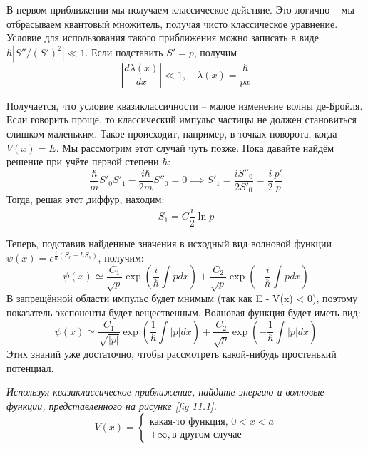 В первом приближении мы получаем классическое действие. Это логично -- мы отбрасываем квантовый множитель, получая чисто классическое уравнение. Условие для использования такого приближения можно записать в виде $\hbar|S''/(S')^2| \ll 1$. Если подставить $S' = p$, получим
\[
|\frac{d\lambda(x)}{dx}| \ll 1, \quad \lambda(x) = \frac{\hbar}{px}
\]

Получается, что условие квазиклассичности -- малое изменение волны де-Бройля. Если говорить проще, то классический импульс частицы не должен становиться слишком маленьким. Такое происходит, например, в точках поворота, когда $V(x) = E$. Мы рассмотрим этот случай чуть позже. Пока давайте найдём решение при учёте первой степени $\hbar$:
\[
\frac{\hbar}{m}S'_0 S'_1 - \frac{i\hbar}{2m}S''_0 = 0 \implies S'_1 = \frac{iS''_0}{2S'_0} = \frac{i}{2}\frac{p'}{p}
\]
Тогда, решая этот диффур, находим:
\[
S_1 = C\frac{i}{2}\ln p
\]

Теперь, подставив найденные значения в исходный вид волновой функции $\psi(x) = e^{\frac{i}{\hbar}(S_0 + \hbar S_1)}$, получим:
\[
\psi(x) \simeq \frac{C_1}{\sqrt{p}}\exp\left(\frac{i}{\hbar}\int p dx \right) + \frac{C_2}{\sqrt{p}}\exp\left(-\frac{i}{\hbar}\int p dx \right)
\]
В запрещённой области импульс будет мнимым (так как E - V(x) < 0), поэтому показатель экспоненты будет вещественным. Волновая функция будет иметь вид:
\[
\psi(x) \simeq \frac{C_1}{\sqrt{|p|}}\exp\left(\frac{1}{\hbar}\int |p| dx \right) + \frac{C_2}{\sqrt{p}}\exp\left(-\frac{1}{\hbar}\int |p| dx \right)
\]
Этих знаний уже достаточно, чтобы рассмотреть какой-нибудь простенький потенциал.
\begin{center}
    \textit{Используя квазиклассическое приближение, найдите энергию и волновые функции, представленного на рисунке \ref{fig 11.1}.}
    \[
    V(x) = 
    \begin{cases}
    \text{какая-то функция, } 0<x<a\\
    +\infty, \text{в другом случае}
    \end{cases}
    \]
\end{center}

